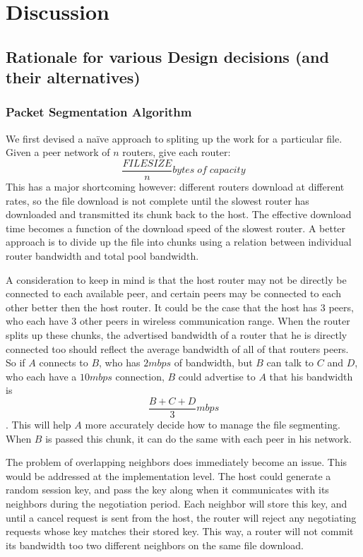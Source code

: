 \documentclass[12pt]{article}
\begin{document}
\newpage
\section{Discussion}

	\subsection{Rationale for various Design decisions (and their alternatives)}

		\subsubsection{Packet Segmentation Algorithm}

			We first devised a na\"{i}ve approach to spliting up the work for a particular file. Given a peer network of $n$ routers, give each router: $$\frac{FILESIZE}{n} bytes\; of\; capacity$$ This has a major shortcoming however: different routers download at different rates, so the file download is not complete until the slowest router has downloaded and transmitted its chunk back to the host. The effective download time becomes a function of the download speed of the slowest router. A better approach is to divide up the file into chunks using a relation between individual router bandwidth and total pool bandwidth.

			A consideration to keep in mind is that the host router may not be directly be connected to each available peer, and certain peers may be connected to each other better then the host router. It could be the case that the host has 3 peers, who each have 3 other peers in wireless communication range. When the router splits up these chunks, the advertised bandwidth of a router that he is directly connected too should reflect the average bandwidth of all of that routers peers. So if $A$ connects to $B$, who has $2 mbps$ of bandwidth, but $B$ can talk to $C$ and $D$, who each have a $10 mbps$ connection, $B$ could advertise to $A$ that his bandwidth is $$\frac{B + C + D}{3} mbps$$. This will help $A$ more accurately decide how to manage the file segmenting. When $B$ is passed this chunk, it can do the same with each peer in his network.

			The problem of overlapping neighbors does immediately become an issue. This would be addressed at the implementation level. The host could generate a random session key, and pass the key along when it communicates with its neighbors during the negotiation period. Each neighbor will store this key, and until a cancel request is sent from the host, the router will reject any negotiating requests whose key matches their stored key. This way, a router will not commit its bandwidth too two different neighbors on the same file download.
\end{document}
